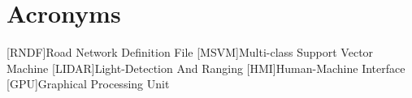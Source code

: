 
\cleardoublepage
\chapter*{Acronyms}\label{ch:acronyms}
\begin{acronym}[acronyms]
\end{acronym}

[RNDF]{Road Network Definition File}
[MSVM]{Multi-class Support Vector Machine}
[LIDAR]{Light-Detection And Ranging}
[HMI]{Human-Machine Interface}
[GPU]{Graphical Processing Unit}
